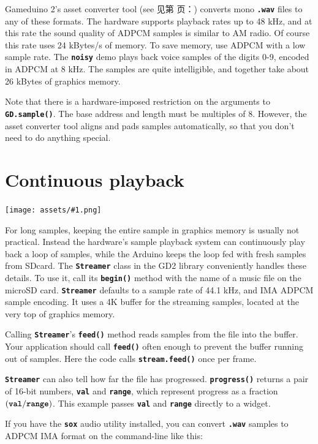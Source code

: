 \documentclass[10pt]{book}
\makeatletter
\newcommand{\gdtwos}{Gameduino 2's }
\newcommand{\png}[1]{
\begin{center}
\texttt{[image: assets/\#1.png]}
\end{center}
}
\newcommand{\mach}[1]{\texttt{\textbf{#1}}}
\newcommand{\cmdidx}[1]{
\index{#1@\mach{#1()}}
}
\newcommand{\cmd}[1]{\cmdidx{cmd\_#1}\nameref{cmd:#1}}
\newcommand{\xref}[1]{见第 \pageref{#1} 页：\textit{\nameref{#1}}}
\makeatother
\begin{document}
\begin{CJK}{UTF8}{gkai}
\gdtwos asset converter tool (see \xref{assets}) converts mono \mach{.wav}
files to any of these formats.
The hardware supports playback rates up to 48 kHz, and at this rate
the sound quality of ADPCM samples is similar to AM radio.
Of course this rate uses 24 kBytes/s of memory.
To save memory, use ADPCM with a low sample rate. The \mach{noisy} demo
plays back voice samples of the digits 0-9, encoded in ADPCM at 8 kHz.
The samples are quite intelligible, and together take about 26 kBytes of
graphics memory.

Note that there is a hardware-imposed restriction on the arguments to \mach{GD.sample()}.
The base address and length must be multiples of 8.
However, the asset converter tool aligns and pads samples automatically,
so that you don't need to do anything special.

\newpage
{}

\newpage
\section{Continuous playback}

\png{song}

For long samples, keeping the entire sample in graphics memory is usually not practical.
Instead the hardware's sample playback system can continuously play back a loop of samples, while the Arduino keeps the loop fed with
fresh samples from SDcard.
The \mach{Streamer} class in the GD2 library conveniently handles these details.
To use it, call its \mach{begin()} method with the name of a music file on the microSD card.
\mach{Streamer} defaults to a sample rate of 44.1 kHz, and IMA ADPCM sample encoding.
It uses a 4K buffer for the streaming samples, located at the very top of graphics memory.

Calling \mach{Streamer}'s \mach{feed()} method reads samples from the file into the buffer.
Your application should call \mach{feed()} often enough to prevent the buffer running out of samples.
Here the code calls \mach{stream.feed()} once per frame.

\mach{Streamer} can also tell how far the file has progressed.
\mach{progress()} returns a pair of 16-bit numbers,
\mach{val} and \mach{range}, which represent progress as a fraction $(\mach{val} / \mach{range})$.
This example passes \mach{val} and \mach{range} directly to a \cmd{slider} widget.

If you have the \mach{sox} audio utility installed, you can convert \mach{.wav} samples to ADPCM IMA format on the command-line like this:


\end{CJK}
\end{document}

